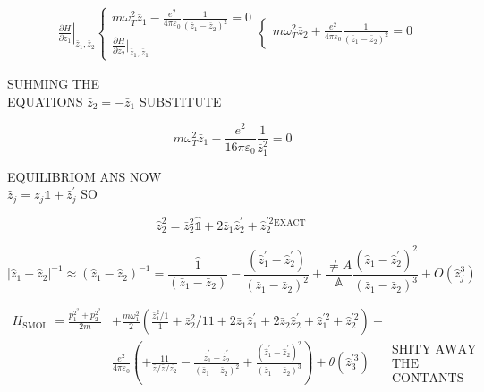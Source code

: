 \documentclass[10pt]{article}
\begin{document}
$$
\begin{aligned}
& \left.\frac{\partial H}{\partial z_{1}}\right|_{\bar{z}_{1}, \bar{z}_{2}}\left\{\begin{array} { l } 
{ m \omega _ { T } ^ { 2 } \overline { z } _ { 1 } - \frac { e ^ { 2 } } { 4 \pi \varepsilon _ { 0 } } \frac { 1 } { ( \overline { z } _ { 1 } - \overline { z } _ { 2 } ) ^ { 2 } } = 0 } \\
{ \frac { \partial H } { \partial z _ { 2 } } | _ { \overline { z } _ { 1 } , \overline { z } _ { 1 } } }
\end{array} \left\{\begin{array}{l}
m \omega_{T}^{2} \bar{z}_{2}+\frac{e^{2}}{4 \pi \varepsilon_{0}} \frac{1}{\left(\bar{z}_{1}-\bar{z}_{2}\right)^{2}}=0
\end{array}\right.\right.
\end{aligned}
$$

SUHMING THE\\
EQUATIONS $\bar{z}_{2}=-\bar{z}_{1}$ SUBSTITUTE

$$
m \omega_{T}^{2} \bar{z}_{1}-\frac{e^{2}}{16 \pi \varepsilon_{0}} \frac{1}{\bar{z}_{1}^{2}}=0
$$

EQUILIBRIOM ANS NOW\\
$\hat{z}_{j}=\bar{z}_{j} \mathbb{1}+\hat{z}_{j}^{\prime}$ SO

$$
\hat{z}_{2}^{2}=\bar{z}_{2}^{2} \hat{\mathbb{1}}+2 \bar{z}_{1} \hat{z}_{2}^{\prime}+\hat{z}_{2}^{\prime 2}{ }^{\text {EXACT }}
$$

$$
\left|\hat{z}_{1}-\hat{z}_{2}\right|^{-1} \approx\left(\hat{z}_{1}-\hat{z}_{2}\right)^{-1}=\frac{\hat{1}}{\left(\bar{z}_{1}-\bar{z}_{2}\right)}-\frac{\left(\hat{z}_{1}^{\prime}-\hat{z}_{2}^{\prime}\right)}{\left(\bar{z}_{1}-\bar{z}_{2}\right)^{2}}+\frac{\neq A}{\mathbb{A}} \frac{\left(\hat{z}_{1}-\hat{z}_{2}^{\prime}\right)^{2}}{\left(\bar{z}_{1}-\bar{z}_{2}\right)^{3}}+O\left(\hat{z}_{j}^{3}\right)
$$

$$
\begin{aligned}
H_{\text {SMOL }}=\frac{p_{1}^{2^{2}}+p_{2}^{2^{2}}}{2 m} & +\frac{m \omega_{1}^{2}}{2}\left(\frac{\bar{z}_{1}^{2} / 1}{1}+\bar{z}_{2}^{2} / 11+2 \bar{z}_{1} \hat{z}_{1}^{\prime}+2 \bar{z}_{2} \hat{z}_{2}^{\prime}+\hat{z}_{1}^{\prime 2}+\hat{z}_{2}^{\prime 2}\right)+ \\
& \frac{e^{2}}{4 \pi \varepsilon_{0}}\left(+\frac{11}{\bar{z} / \bar{z} / \overline{z_{2}}}-\frac{\hat{z}_{1}^{\prime}-\hat{z}_{2}^{\prime}}{\left(\bar{z}_{1}-\bar{z}_{2}\right)^{2}}+\frac{\left(\hat{z}_{1}^{\prime}-\hat{z}_{2}^{\prime}\right)^{2}}{\left(\bar{z}_{1}-\bar{z}_{2}\right)^{3}}\right)+\theta\left(\hat{z}_{3}^{\prime 3}\right) \quad \begin{array}{c}
\text { SHITY AWAY } \\
\text { THE } \\
\text { CONTANTS }
\end{array}
\end{aligned}
$$
\end{document}
